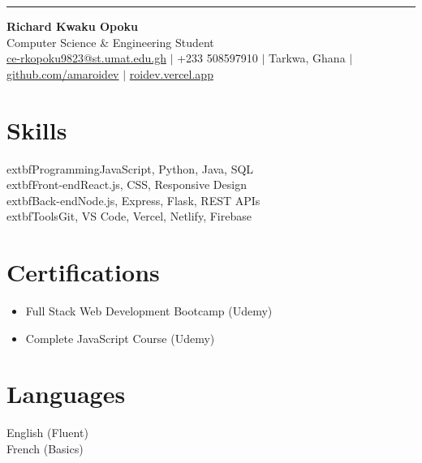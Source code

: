 \documentclass[10pt,a4paper]{article}
\begin{document}
\begin{minipage}[t]{0.07\textwidth}
  \vspace{0pt}\color{cvgreen}\rule{4pt}{\textheight}
\end{minipage}\hfill
\begin{minipage}[t]{0.92\textwidth}
  {\Huge\bfseries Richard Kwaku Opoku}\\[3pt]
  {\small\color{cvgray}Computer Science \& Engineering Student}\\[6pt]
  {\footnotesize\href{mailto:ce-rkopoku9823@st.umat.edu.gh}{ce-rkopoku9823@st.umat.edu.gh} $\mid$ +233 508597910 $\mid$ Tarkwa, Ghana $\mid$ \href{https://github.com/amaroidev}{github.com/amaroidev} $\mid$ \href{https://roidev.vercel.app}{roidev.vercel.app}}
\end{minipage}

\vspace{8pt}

\begin{minipage}[t]{0.32\textwidth}
  \section*{Skills}
  	extbf{Programming}\newline JavaScript, Python, Java, SQL\\[3pt]
  	extbf{Front-end}\newline React.js, CSS, Responsive Design\\[3pt]
  	extbf{Back-end}\newline Node.js, Express, Flask, REST APIs\\[3pt]
  	extbf{Tools}\newline Git, VS Code, Vercel, Netlify, Firebase
  
  \vspace{6pt}
  \section*{Certifications}
  \begin{itemize}
    \item Full Stack Web Development Bootcamp (Udemy)
    \item Complete JavaScript Course (Udemy)
  \end{itemize}

  \vspace{6pt}
  \section*{Languages}
  English (Fluent) \\ French (Basics)
\end{minipage}\hfill
\end{document}
